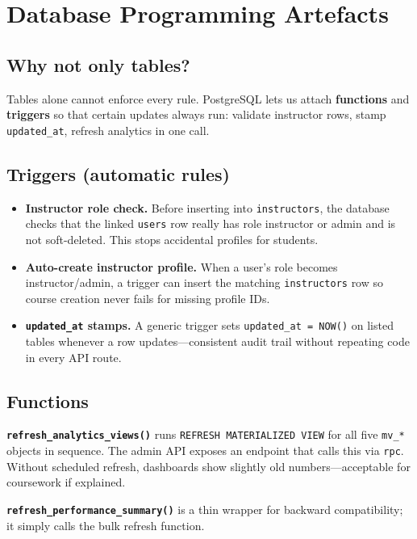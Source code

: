 
\chapter{Database Programming Artefacts}
\label{ch:objs}

\section{Why not only tables?}
Tables alone cannot enforce every rule. PostgreSQL lets us attach \textbf{functions} and \textbf{triggers} so that certain updates always run: validate instructor rows, stamp \texttt{updated\_at}, refresh analytics in one call.

\section{Triggers (automatic rules)}
\begin{itemize}[leftmargin=*]
  \item \textbf{Instructor role check.} Before inserting into \texttt{instructors}, the database checks that the linked \texttt{users} row really has role instructor or admin and is not soft-deleted. This stops accidental profiles for students.

  \item \textbf{Auto-create instructor profile.} When a user's role becomes instructor/admin, a trigger can insert the matching \texttt{instructors} row so course creation never fails for missing profile IDs.

  \item \textbf{\texttt{updated\_at} stamps.} A generic trigger sets \texttt{updated\_at = NOW()} on listed tables whenever a row updates---consistent audit trail without repeating code in every API route.
\end{itemize}

\section{Functions}
\textbf{\texttt{refresh\_analytics\_views()}} runs \texttt{REFRESH MATERIALIZED VIEW} for all five \texttt{mv\_*} objects in sequence. The admin API exposes an endpoint that calls this via \texttt{rpc}. Without scheduled refresh, dashboards show slightly old numbers---acceptable for coursework if explained.

\textbf{\texttt{refresh\_performance\_summary()}} is a thin wrapper for backward compatibility; it simply calls the bulk refresh function.

